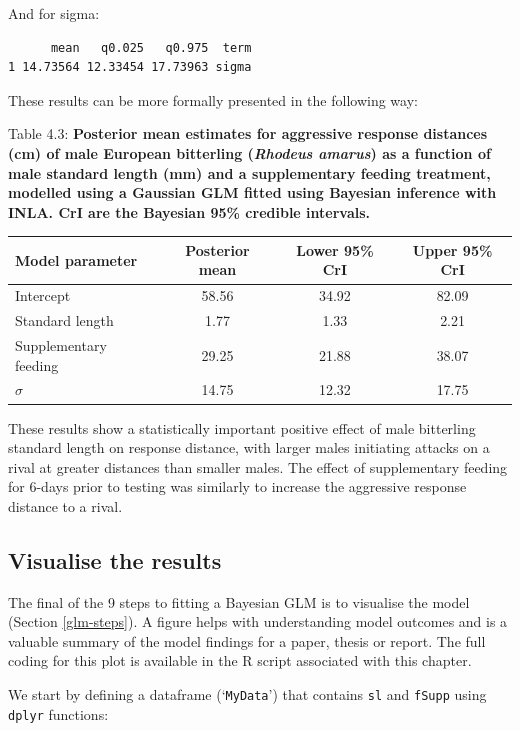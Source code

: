 \documentclass[
]{book}
\begin{document}
And for sigma:

\begin{verbatim}
      mean   q0.025   q0.975  term
1 14.73564 12.33454 17.73963 sigma
\end{verbatim}

These results can be more formally presented in the following way:

Table 4.3: \textbf{Posterior mean estimates for aggressive response distances (cm) of male European bitterling (\emph{Rhodeus amarus}) as a function of male standard length (mm) and a supplementary feeding treatment, modelled using a Gaussian GLM fitted using Bayesian inference with INLA. CrI are the Bayesian 95\% credible intervals.}

\begin{longtable}[]{@{}lccc@{}}
\toprule
Model parameter & Posterior mean & Lower 95\% CrI & Upper 95\% CrI \\
\midrule
\endhead
Intercept & 58.56 & 34.92 & 82.09 \\
Standard length & 1.77 & 1.33 & 2.21 \\
Supplementary feeding & 29.25 & 21.88 & 38.07 \\
\(\sigma\) & 14.75 & 12.32 & 17.75 \\
\bottomrule
\end{longtable}

These results show a statistically important positive effect of male bitterling standard length on response distance, with larger males initiating attacks on a rival at greater distances than smaller males. The effect of supplementary feeding for 6-days prior to testing was similarly to increase the aggressive response distance to a rival.

\hypertarget{visualise-the-results}{%
\subsection{Visualise the results}\label{visualise-the-results}}

The final of the 9 steps to fitting a Bayesian GLM is to visualise the model (Section \ref{glm-steps}). A figure helps with understanding model outcomes and is a valuable summary of the model findings for a paper, thesis or report. The full coding for this plot is available in the R script associated with this chapter.

We start by defining a dataframe (`\texttt{MyData}') that contains \texttt{sl} and \texttt{fSupp} using \texttt{dplyr} functions:
\end{document}
